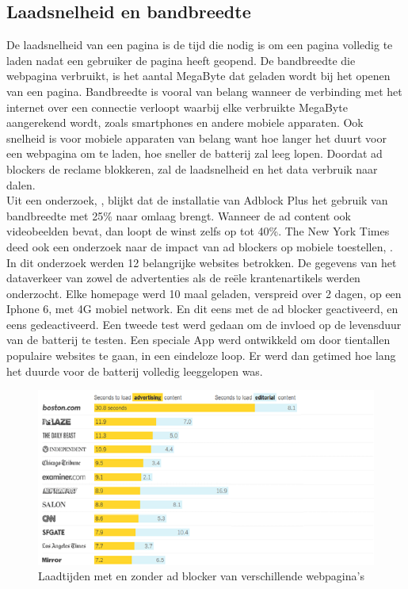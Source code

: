 \documentclass[pdftex,a4paper,12pt,twoside]{report}
\begin{document}
\subsection{Laadsnelheid en bandbreedte}
\label{sec Laadsnelheid en bandbreedte}
De laadsnelheid van een pagina is de tijd die nodig is om een pagina volledig te laden nadat een gebruiker de pagina heeft geopend. De bandbreedte die webpagina verbruikt, is het aantal MegaByte dat geladen wordt bij het openen van een pagina. Bandbreedte is vooral van belang wanneer de verbinding met het internet over een connectie verloopt waarbij elke verbruikte MegaByte aangerekend wordt, zoals smartphones en andere mobiele apparaten. Ook snelheid is voor mobiele apparaten van belang want hoe langer het duurt voor een webpagina om te laden, hoe sneller de batterij zal leeg lopen. Doordat ad blockers de reclame blokkeren, zal de laadsnelheid en het data verbruik naar dalen.
\\
Uit een onderzoek, \cite{Fraser2015}, blijkt dat de installatie van Adblock Plus het gebruik van bandbreedte met 25\% naar omlaag brengt. Wanneer de ad content ook videobeelden bevat, dan loopt de winst zelfs op tot 40\%.
The New York Times deed ook een onderzoek naar de impact van ad blockers op mobiele toestellen, \cite{nytimes2015}.
In dit onderzoek werden 12 belangrijke websites betrokken. De gegevens van het dataverkeer van zowel de advertenties als de reële krantenartikels werden onderzocht. Elke homepage werd 10 maal geladen, verspreid over 2 dagen, op een Iphone 6, met 4G mobiel network. En dit eens met de ad blocker geactiveerd, en eens gedeactiveerd. Een tweede test werd gedaan om de invloed op de levensduur van de batterij te testen. Een speciale App werd ontwikkeld om door tientallen populaire websites te gaan, in een eindeloze loop. Er werd dan getimed hoe lang het duurde voor de batterij volledig leeggelopen was.

\begin{figure}[h!]
\centering
\includegraphics[width=12cm]{img/LoadTimes}
\caption{Laadtijden met en zonder ad blocker van verschillende webpagina's}
\label{fig: Redenadblockreclame}
\end{figure}
\end{document}
